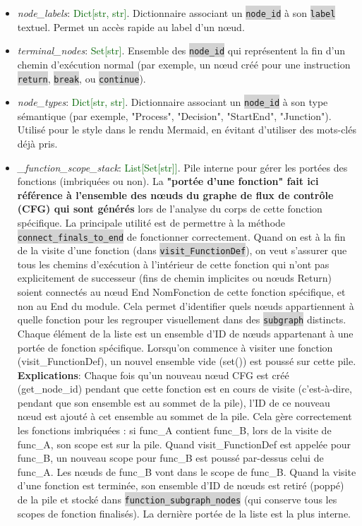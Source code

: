 \documentclass[11pt,a4paper]{article}
\newcommand{\code}[1]{\colorbox{lightgray}{\texttt{\small #1}}}
\newcommand{\var}[1]{\textit{#1}}
\newcommand{\vartype}[1]{\textcolor{darkgreen}{#1}}
\begin{document}
\begin{description}
\begin{itemize}
        \item \var{node\_labels}: \vartype{Dict[str, str]}. Dictionnaire associant un \code{node\_id} à son \code{label} textuel. Permet un accès rapide au label d'un nœud.
        
        \item \var{terminal\_nodes}: \vartype{Set[str]}. Ensemble des \code{node\_id} qui représentent la fin d'un chemin d'exécution normal (par exemple, un nœud créé pour une instruction \code{return}, \code{break}, ou \code{continue}).
        
        \item \var{node\_types}: \vartype{Dict[str, str]}. Dictionnaire associant un \code{node\_id} à son type sémantique (par exemple, "Process", "Decision", "StartEnd", "Junction"). Utilisé pour le style dans le rendu Mermaid, en évitant d'utiliser des mots-clés déjà pris.
        
        \item \var{\_function\_scope\_stack}: \vartype{List[Set[str]]}. Pile interne pour gérer les portées des fonctions (imbriquées ou non). La \textbf{"portée d'une fonction" fait ici référence à l'ensemble des nœuds du graphe de flux de contrôle (CFG) qui sont générés} lors de l'analyse du corps de cette fonction spécifique. La principale utilité est de permettre à la méthode \code{connect\_finals\_to\_end} de fonctionner correctement. Quand on est à la fin de la visite d'une fonction (dans \code{visit\_FunctionDef}), on veut s'assurer que tous les chemins d'exécution à l'intérieur de cette fonction qui n'ont pas explicitement de successeur (fins de chemin implicites ou nœuds Return) soient connectés au nœud End {NomFonction} de cette fonction spécifique, et non au End du module. Cela permet d'identifier quels nœuds appartiennent à quelle fonction pour les regrouper visuellement dans des \code{subgraph} distincts. Chaque élément de la liste est un ensemble d'ID de nœuds appartenant à une portée de fonction spécifique. Lorsqu'on commence à visiter une fonction (visit\_FunctionDef), un nouvel ensemble vide (set()) est poussé sur cette pile. \textbf{Explications}: Chaque fois qu'un nouveau nœud CFG est créé (get\_node\_id) pendant que cette fonction est en cours de visite (c'est-à-dire, pendant que son ensemble est au sommet de la pile), l'ID de ce nouveau nœud est ajouté à cet ensemble au sommet de la pile. Cela gère correctement les fonctions imbriquées : si func\_A contient func\_B, lors de la visite de func\_A, son scope est sur la pile. Quand visit\_FunctionDef est appelée pour func\_B, un nouveau scope pour func\_B est poussé par-dessus celui de func\_A. Les nœuds de func\_B vont dans le scope de func\_B. Quand la visite d'une fonction est terminée, son ensemble d'ID de nœuds est retiré (poppé) de la pile et stocké dans \code{function\_subgraph\_nodes} (qui conserve tous les scopes de fonction finalisés). La dernière portée de la liste est la plus interne.
        

\end{itemize}
\end{description}
\end{document}
